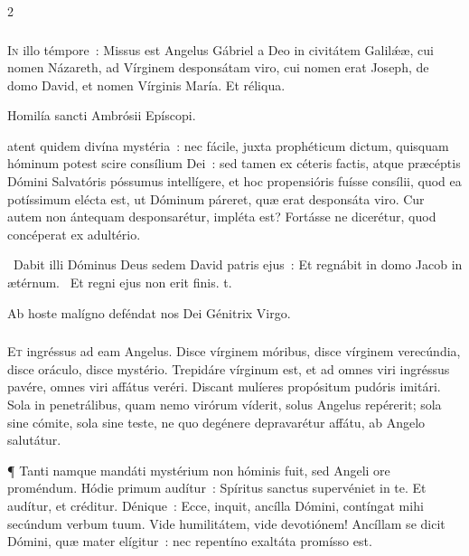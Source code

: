 \documentclass[9pt,twoside]{extarticle}
\begin{document}
\begin{multicols}{2}
\subsubsection*{\center {}}
\lettrine{I}n illo témpore~: Missus est Angelus Gábriel a Deo in civitátem Galilǽæ, cui nomen Názareth, ad Vírginem desponsátam viro, cui nomen erat Joseph, de domo David, et nomen Vírginis María. Et réliqua.

\begin{center}Homilía sancti Ambrósii Epíscopi.\\
\end{center}
atent quidem divína mystéria~: nec fácile, juxta prophéticum dictum, quisquam hóminum potest scire consílium Dei~: sed tamen ex céteris factis, atque præcéptis Dómini Salvatóris póssumus intellígere, et hoc propensióris fuísse consílii, quod ea potíssimum elécta est, ut Dóminum páreret, quæ erat desponsáta viro. Cur autem non ántequam desponsarétur, impléta est? Fortásse ne dicerétur, quod concéperat ex adultério.

\begin{tightlist}{}
\item {}~Dabit illi Dóminus Deus sedem David patris ejus~: \textred{*} Et regnábit in domo Jacob in ætérnum. ~Et regni ejus non erit finis. t.
\item {\small {} Ab hoste malígno deféndat nos Dei Génitrix Virgo.}
\item {}
\end{tightlist}

\subsubsection*{\center {}}
\lettrine{E}t ingréssus ad eam Angelus. Disce vírginem móribus, disce vírginem verecúndia, disce oráculo, disce mystério. Trepidáre vírginum est, et ad omnes viri ingréssus pavére, omnes viri affátus veréri. Discant mulíeres propósitum pudóris imitári. Sola in penetrálibus, quam nemo virórum víderit, solus Angelus repérerit; sola sine cómite, sola sine teste, ne quo degénere depravarétur affátu, ab Angelo salutátur.

¶ Tanti namque mandáti mystérium non hóminis fuit, sed Angeli ore proméndum. Hódie primum audítur~: Spíritus sanctus supervéniet in te. Et audítur, et créditur. Dénique~: Ecce, inquit, ancílla Dómini, contíngat mihi secúndum verbum tuum. Vide humilitátem, vide devotiónem! Ancíllam se dicit Dómini, quæ mater elígitur~: nec repentíno exaltáta promísso est.


\end{multicols}
\end{document}
